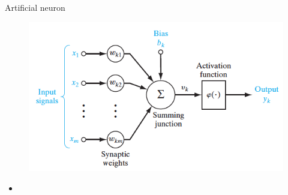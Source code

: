 \documentclass{beamer}
\begin{document}
\begin{frame}{Artificial neuron}

\begin{figure}[h!]
  \centering
  \includegraphics[width=1\textwidth]{images/aneuron.png}
\end{figure}

\begin{itemize}
\item 
\end{itemize}

\end{frame}
\end{document}
